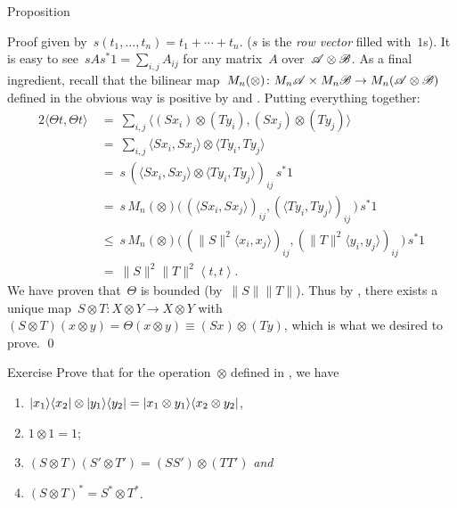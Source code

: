 \begin{parsec}
\begin{point}{Proposition}
\begin{point}{Proof}
    given by~$s(t_1, \ldots, t_n) = t_1 + \cdots + t_n$.
    ($s$ is the \emph{row vector} filled with~$1$s).
It is easy to see~$s A s^* 1= \sum_{i,j} A_{ij}$
    for any matrix~$A$ over~$\mathscr{A} \otimes \mathscr{B}$.
As a final ingredient,
    recall that the
    bilinear map~$M_n(\otimes) \colon M_n \mathscr{A} \times M_n \mathscr{B} \to
                M_n( \mathscr{A} \otimes \mathscr{B})$
        defined in the obvious way
        is positive by  and .
    Putting everything together:
\begin{alignat*}{2}
    \langle \Theta t, \Theta t \rangle
        & \ = \ \sum_{i,j} \langle 
    (Sx_i) \otimes (Ty_i),
    (Sx_j) \otimes (Ty_j)
            \rangle  \\
        & \ = \ \sum_{i,j} 
    \langle Sx_i, S x_j \rangle
    \otimes \langle Ty_i, T y_j \rangle \\
    & \ = \ 
    s \,
    \left( 
    \langle Sx_i, S x_j \rangle
    \otimes \langle Ty_i, T y_j \rangle
\right)_{ij}  \,
     s^*1 \\
    & \ = \ 
     s \,
M_n(\otimes) \bigl(\,
    \left( 
    \langle Sx_i, S x_j \rangle \right)_{ij},
\left( \langle Ty_i, T y_j \rangle \right)_{ij} \,\bigr) 
\, s^*1 \\
    & \ \leq \ 
s \,
M_n(\otimes) \bigl(\,
    ( 
    \|S\|^2 \langle x_i,  x_j \rangle )_{ij},
(\|T\|^2 \langle y_i,  y_j \rangle )_{ij} \,\bigr) 
\, s^*1 \\
        & \ = \
    \|S\|^2\|T\|^2 \left<t,t\right>.
\end{alignat*}
We have proven that~$\Theta$ is bounded (by~$\|S\|\|T\|$).
Thus by ,
    there exists a unique map~$S \otimes T \colon X\otimes Y \to X\otimes Y$
    with~$(S \otimes T) (x \otimes y) = \Theta(x \otimes y)
        \equiv (S x) \otimes (Ty)$,
        which is what we desired to prove. \qed
\end{point}
\end{point}
\begin{point}[hilbmod-tensor-ketbra]{Exercise}%
Prove that for the
operation~$\otimes$ defined in , we have
\begin{enumerate}
    \item $\left|x_1\right>\!\left<x_2\right| \otimes \left|y_1\right>\!\left<y_2\right|
            = \left|x_1\otimes y_1\right>\!\left<x_2\otimes y_2\right|$,
        \item $1 \otimes 1 = 1$;
    \item $(S \otimes T) (S' \otimes T') = (SS' ) \otimes (TT')$
                \emph{and}
            \item $(S \otimes T)^* = S^* \otimes T^*$.


\end{enumerate}
\end{point}
\end{parsec}

